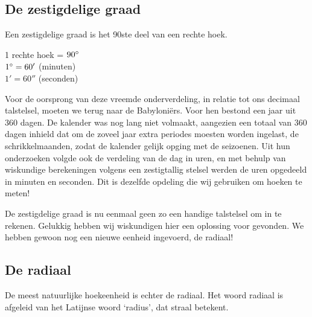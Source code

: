 \documentclass[a4paper,12pt,twoside ]{article}
\begin{document}
\subsection{De zestigdelige graad}
Een zestigdelige graad is het 90ste deel van een rechte hoek.\\
\begin{center}
1 rechte hoek = $90^\circ$\\
$1^\circ = 60'$ (minuten)\\
$1' = 60''$ (seconden)\\
\end{center}
Voor de oorsprong van deze vreemde onderverdeling, in relatie tot ons decimaal talstelsel, moeten we terug naar de Babyloniërs. Voor hen bestond een jaar uit 360 dagen. De kalender was nog lang niet volmaakt, aangezien een totaal van 360 dagen inhield dat om de zoveel jaar extra periodes moesten worden ingelast, de schrikkelmaanden, zodat de kalender gelijk opging met de seizoenen. Uit hun onderzoeken volgde ook de verdeling van de dag in uren, en met behulp van wiskundige berekeningen volgens een zestigtallig stelsel werden de uren opgedeeld in minuten en seconden.
Dit is dezelfde opdeling die wij gebruiken om hoeken te meten!

De zestigdelige graad is nu eenmaal geen zo een handige talstelsel om in te rekenen. Gelukkig hebben wij wiskundigen hier een oplossing voor gevonden. We hebben gewoon nog een nieuwe eenheid ingevoerd, de radiaal!

\pagebreak
\subsection{De radiaal}
De meest natuurlijke hoekeenheid is echter de radiaal. Het woord radiaal is afgeleid van het Latijnse woord ‘radius’, dat straal betekent.
\end{document}
